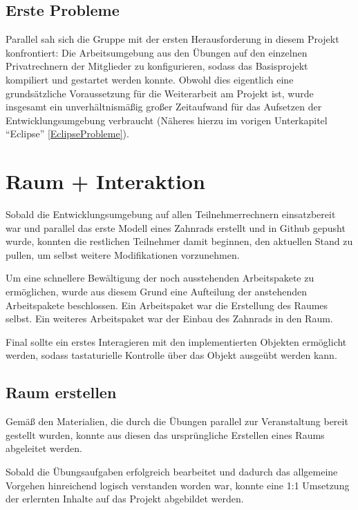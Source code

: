 \documentclass{article}
\begin{document}
\subsection{Erste Probleme}
Parallel sah sich die Gruppe mit der ersten Herausforderung in diesem Projekt konfrontiert: 
Die Arbeitsumgebung aus den Übungen auf den einzelnen Privatrechnern der Mitglieder zu konfigurieren, sodass das Basisprojekt kompiliert und gestartet werden konnte. 
Obwohl dies eigentlich eine grundsätzliche Voraussetzung für die Weiterarbeit am Projekt ist, wurde insgesamt ein unverhältnismäßig großer Zeitaufwand für das Aufsetzen der Entwicklungsumgebung verbraucht (Näheres hierzu im vorigen Unterkapitel \enquote{Eclipse} \ref{EclipseProbleme}). 



\section{Raum + Interaktion}
Sobald die Entwicklungsumgebung auf allen Teilnehmerrechnern einsatzbereit war und parallel das erste Modell eines Zahnrads erstellt und in Github gepusht wurde, konnten die restlichen Teilnehmer damit beginnen, den aktuellen Stand zu pullen, um selbst weitere Modifikationen vorzunehmen. 

Um eine schnellere Bewältigung der noch ausstehenden Arbeitspakete zu ermöglichen, wurde aus diesem Grund eine Aufteilung der anstehenden Arbeitspakete beschlossen. 
Ein Arbeitspaket war die Erstellung des Raumes selbst. 
Ein weiteres Arbeitspaket war der Einbau des Zahnrads in den Raum. 

Final sollte ein erstes Interagieren mit den implementierten Objekten ermöglicht werden, sodass tastaturielle Kontrolle über das Objekt ausgeübt werden kann. 



\subsection{Raum erstellen}
Gemäß den Materialien, die durch die Übungen parallel zur Veranstaltung bereit gestellt wurden, konnte aus diesen das ursprüngliche Erstellen eines Raums abgeleitet werden. 

Sobald die Übungsaufgaben erfolgreich bearbeitet und dadurch das allgemeine Vorgehen hinreichend logisch verstanden worden war, konnte eine 1:1 Umsetzung der erlernten Inhalte auf das Projekt abgebildet werden. 
\end{document}
